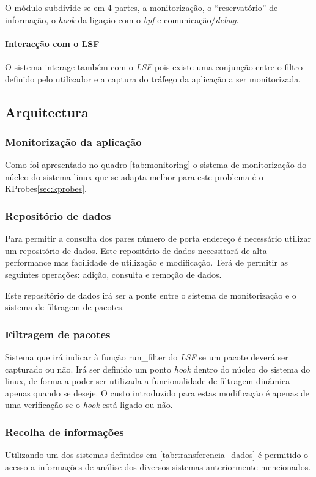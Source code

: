 O módulo subdivide-se em 4 partes, a monitorização, o ``reservatório'' de
informação, o \textit{hook} da ligação com o \textit{bpf} e
comunicação/\textit{debug}.

\paragraph{Interacção com o LSF}
O sistema interage também com o \textit{LSF} pois existe uma conjunção
entre o filtro definido pelo utilizador e a captura do tráfego da aplicação a
ser monitorizada.

\subsection{Arquitectura}

\subsubsection{Monitorização da aplicação}

Como foi apresentado no quadro \ref{tab:monitoring} o sistema de monitorização
do núcleo do sistema linux que se adapta melhor para este problema é o
KProbes\ref{sec:kprobes}. 

\subsubsection{Repositório de dados}

Para permitir a consulta dos pares número de porta endereço é necessário
utilizar um repositório de dados. Este repositório de dados necessitará de alta
performance mas facilidade de utilização e modificação. Terá de permitir as
seguintes operações: adição, consulta e remoção de dados.

Este repositório de dados irá ser a ponte entre o sistema de  monitorização e o
sistema de filtragem de pacotes. 

\subsubsection{Filtragem de pacotes}

Sistema que irá indicar à função run\_filter do \textit{LSF} se um pacote deverá
ser capturado ou não. Irá ser definido um ponto \textit{hook} dentro do núcleo
do sistema do linux, de forma a poder ser utilizada a funcionalidade de
filtragem dinâmica apenas quando se deseje. O custo introduzido para estas
modificação é apenas de uma verificação se o \textit{hook} está ligado ou não.


\subsubsection{Recolha de informações}

Utilizando um dos sistemas definidos em \ref{tab:transferencia_dados} é
permitido o acesso a informações de análise dos diversos sistemas anteriormente
mencionados.



